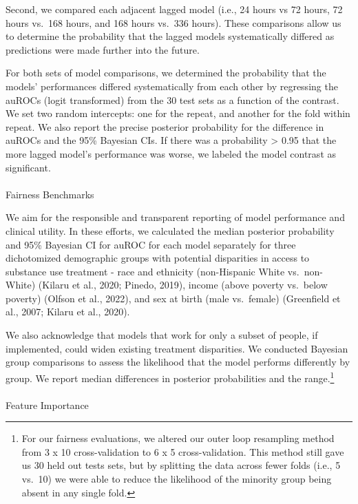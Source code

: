 \documentclass[
]{agujournal2019}
\makeatletter
\let\oldparagraph\paragraph
\renewcommand{\paragraph}{
    \@ifstar
      \xxxParagraphStar
      \xxxParagraphNoStar
  }
\newcommand{\xxxParagraphStar}[1]{\oldparagraph*{#1}\mbox{}}
\newcommand{\xxxParagraphNoStar}[1]{\oldparagraph{#1}\mbox{}}
\makeatother
\begin{document}
Second, we compared each adjacent lagged model (i.e., 24 hours vs 72
hours, 72 hours vs.~168 hours, and 168 hours vs.~336 hours). These
comparisons allow us to determine the probability that the lagged models
systematically differed as predictions were made further into the
future.

For both sets of model comparisons, we determined the probability that
the models' performances differed systematically from each other by
regressing the auROCs (logit transformed) from the 30 test sets as a
function of the contrast. We set two random intercepts: one for the
repeat, and another for the fold within repeat. We also report the
precise posterior probability for the difference in auROCs and the 95\%
Bayesian CIs. If there was a probability \textgreater{} 0.95 that the
more lagged model's performance was worse, we labeled the model contrast
as significant.

\paragraph{Fairness Benchmarks}\label{fairness-benchmarks}

We aim for the responsible and transparent reporting of model
performance and clinical utility. In these efforts, we calculated the
median posterior probability and 95\% Bayesian CI for auROC for each
model separately for three dichotomized demographic groups with
potential disparities in access to substance use treatment - race and
ethnicity (non-Hispanic White vs.~non-White) (Kilaru et al., 2020;
Pinedo, 2019), income (above poverty vs.~below poverty) (Olfson et al.,
2022), and sex at birth (male vs.~female) (Greenfield et al., 2007;
Kilaru et al., 2020).

We also acknowledge that models that work for only a subset of people,
if implemented, could widen existing treatment disparities. We conducted
Bayesian group comparisons to assess the likelihood that the model
performs differently by group. We report median differences in posterior
probabilities and the range.\footnote{For our fairness evaluations, we
  altered our outer loop resampling method from 3 x 10 cross-validation
  to 6 x 5 cross-validation. This method still gave us 30 held out tests
  sets, but by splitting the data across fewer folds (i.e., 5 vs.~10) we
  were able to reduce the likelihood of the minority group being absent
  in any single fold.}

\paragraph{Feature Importance}\label{feature-importance}
\end{document}
